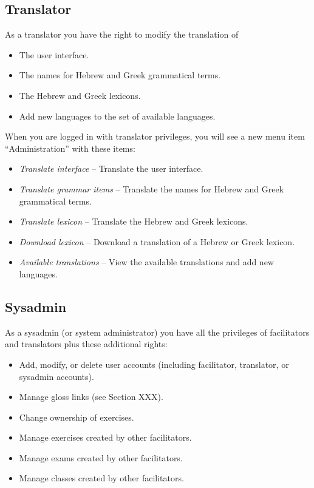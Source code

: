 \documentclass[11pt,oneside,a4paper]{memoir}
\begin{document}
\subsection{Translator}

As a translator you have the right to modify the translation of

\begin{itemize}
\item The user interface.
\item The names for Hebrew and Greek grammatical terms.
\item The Hebrew and Greek lexicons.
\item Add new languages to the set of available languages.
\end{itemize}

When you are logged in with translator privileges, you will see a new menu item ``Administration'' with these items:

\begin{itemize}
\item \emph{Translate interface} -- Translate the user interface.
\item \emph{Translate grammar items} -- Translate the names for Hebrew and Greek grammatical terms.
\item \emph{Translate lexicon} -- Translate the Hebrew and Greek lexicons.
\item \emph{Download lexicon} -- Download a translation of a Hebrew or Greek lexicon.
\item \emph{Available translations} -- View the available translations and add new languages.
\end{itemize}

\subsection{Sysadmin}

As a sysadmin (or system administrator) you have all the privileges of facilitators and translators
plus these additional rights:

\begin{itemize}
\item Add, modify, or delete user accounts (including facilitator, translator, or sysadmin accounts).
\item Manage gloss links (see Section XXX).
\item Change ownership of exercises.
\item Manage exercises created by other facilitators.
\item Manage exams created by other facilitators.
\item Manage classes created by other facilitators.
\end{itemize}
\end{document}
